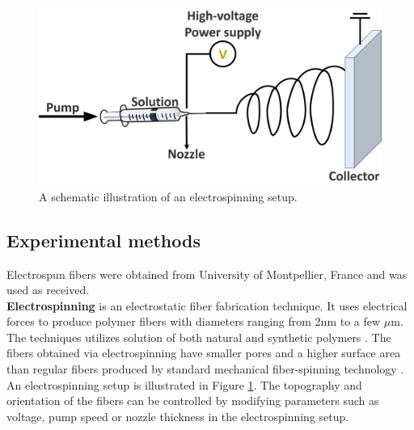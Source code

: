 \begin{figure}[th!]
\centering
\includegraphics[width=\textwidth]{Figures/chap6fig/electrospinning}
\caption{A schematic illustration of an electrospinning setup.}
\label{Figures/chap6fig:electrospinning}
\end{figure}

\subsection{Experimental methods}
Electrospun  fibers were obtained from University of Montpellier, France and was used as received. \\
\textbf{Electrospinning} is an electrostatic fiber fabrication technique. It uses electrical forces to produce polymer fibers with diameters ranging from 2nm to a few $\mu$m. The techniques utilizes solution of both natural and synthetic polymers \cite{bhard}. The fibers obtained via electrospinning have smaller pores and a higher surface area than regular fibers produced by standard mechanical fiber-spinning technology \cite{huang_review}. An electrospinning setup is illustrated in Figure \ref{Figures/chap6fig:electrospinning}. The topography and orientation of the fibers can be controlled by modifying parameters such as voltage, pump speed or nozzle thickness in the electrospinning setup.


